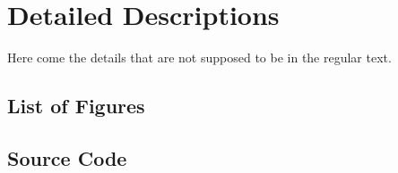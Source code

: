 \chapter{Detailed Descriptions}
\label{chapter:DetailedDescriptions}
Here come the details that are not supposed to be in the regular text.

\section{List of Figures}
\begingroup
\let\oldclearpage\clearpage
\let\clearpage\relax
\listoffigures
\let\clearpage\oldclearpage
\endgroup
\newpage

\section{Source Code}


